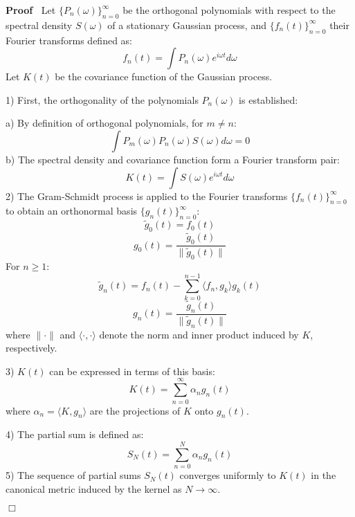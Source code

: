 \documentclass{article}
\newcommand{\cdummy}{\cdot}
\newenvironment{proof}{\noindent\textbf{Proof\ }}{\hspace*{\fill}$\Box$\medskip}
\begin{document}
\begin{proof}
  Let $\{P_n (\omega)\}_{n = 0}^{\infty}$ be the orthogonal polynomials with
  respect to the spectral density $S (\omega)$ of a stationary Gaussian
  process, and $\{f_n (t)\}_{n = 0}^{\infty}$ their Fourier transforms defined
  as:
  \begin{equation}
    f_n (t) = \int P_n (\omega) e^{i \omega t} d \omega
  \end{equation}
  Let $K (t)$ be the covariance function of the Gaussian process.
  
  1) First, the orthogonality of the polynomials $P_n (\omega)$ is
  established:
  
  a) By definition of orthogonal polynomials, for $m \neq n$:
  \begin{equation}
    \int P_m (\omega) P_n (\omega) S (\omega) d \omega = 0
  \end{equation}
  b) The spectral density and covariance function form a Fourier transform
  pair:
  \begin{equation}
    K (t) = \int S (\omega) e^{i \omega t} d \omega
  \end{equation}
  2) The Gram-Schmidt process is applied to the Fourier transforms $\{f_n
  (t)\}_{n = 0}^{\infty}$ to obtain an orthonormal basis $\{g_n (t)\}_{n =
  0}^{\infty}$:
  \begin{equation}
    \tilde{g}_0 (t) = f_0 (t)
  \end{equation}
  \begin{equation}
    g_0 (t) = \frac{\tilde{g}_0 (t)}{\| \tilde{g}_0 (t)\|}
  \end{equation}
  For $n \geq 1$:
  \begin{equation}
    \tilde{g}_n (t) = f_n (t) - \sum_{k = 0}^{n - 1} \langle f_n, g_k \rangle
    g_k (t)
  \end{equation}
  \begin{equation}
    g_n (t) = \frac{\tilde{g}_n (t)}{\| \tilde{g}_n (t)\|}
  \end{equation}
  where $\| \cdummy \|$ and $\langle \cdummy, \cdummy \rangle$ denote the norm
  and inner product induced by $K$, respectively.
  
  3) $K (t)$ can be expressed in terms of this basis:
  \begin{equation}
    K (t) = \sum_{n = 0}^{\infty} \alpha_n g_n (t)
  \end{equation}
  where $\alpha_n = \langle K, g_n \rangle$ are the projections of $K$ onto
  $g_n (t)$.
  
  4) The partial sum is defined as:
  \begin{equation}
    S_N (t) = \sum_{n = 0}^N \alpha_n g_n (t)
  \end{equation}
  5) The sequence of partial sums $S_N (t)$ converges uniformly to $K (t)$ in
  the canonical metric induced by the kernel as $N \to \infty$.
  

\end{proof}
\end{document}
